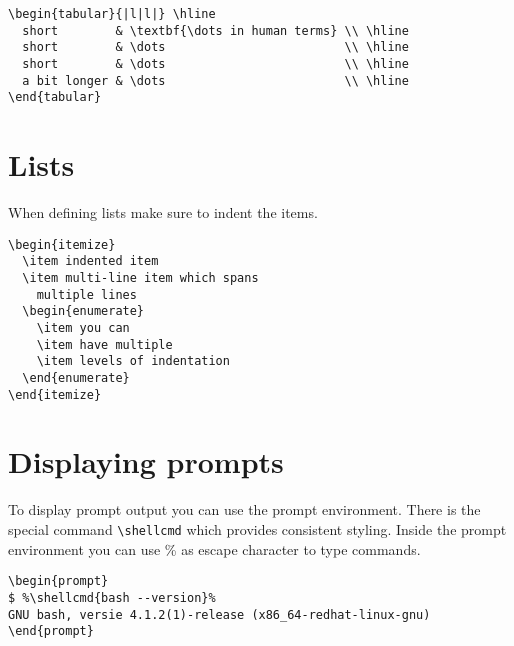 \documentclass[11pt,a4paper]{article}
\begin{document}
\begin{verbatim}
\begin{tabular}{|l|l|} \hline
  short        & \textbf{\dots in human terms} \\ \hline
  short        & \dots                         \\ \hline
  short        & \dots                         \\ \hline
  a bit longer & \dots                         \\ \hline
\end{tabular}
\end{verbatim}

\section{Lists}
\label{sec:lists}

When defining lists make sure to indent the items.

\begin{verbatim}
\begin{itemize}
  \item indented item
  \item multi-line item which spans
    multiple lines
  \begin{enumerate}
    \item you can
    \item have multiple
    \item levels of indentation
  \end{enumerate}
\end{itemize}
\end{verbatim}

\section{Displaying prompts}
\label{sec:displaying-prompts}

To display prompt output you can use the prompt environment. There is the
special command \texttt{\textbackslash{}shellcmd{}} which provides consistent
styling. Inside the prompt environment you can use \% as escape character to
type commands.

\begin{verbatim}
\begin{prompt}
$ %\shellcmd{bash --version}%
GNU bash, versie 4.1.2(1)-release (x86_64-redhat-linux-gnu)
\end{prompt}
\end{verbatim}
\end{document}
